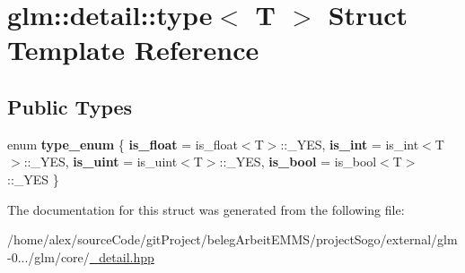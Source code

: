 \hypertarget{structglm_1_1detail_1_1type}{\section{glm\-:\-:detail\-:\-:type$<$ T $>$ Struct Template Reference}
\label{structglm_1_1detail_1_1type}
}
\subsection*{Public Types}
\begin{DoxyCompactItemize}
\item 
enum {\bfseries type\-\_\-enum} \{ {\bfseries is\-\_\-float} = is\-\_\-float$<$T$>$\-:\-:\-\_\-\-Y\-E\-S, 
{\bfseries is\-\_\-int} = is\-\_\-int$<$T$>$\-:\-:\-\_\-\-Y\-E\-S, 
{\bfseries is\-\_\-uint} = is\-\_\-uint$<$T$>$\-:\-:\-\_\-\-Y\-E\-S, 
{\bfseries is\-\_\-bool} = is\-\_\-bool$<$T$>$\-:\-:\-\_\-\-Y\-E\-S
 \}
\end{DoxyCompactItemize}


The documentation for this struct was generated from the following file\-:\begin{DoxyCompactItemize}
\item 
/home/alex/source\-Code/git\-Project/beleg\-Arbeit\-E\-M\-M\-S/project\-Sogo/external/glm-\/0.../glm/core/\hyperlink{__detail_8hpp}{\-\_\-detail.\-hpp}\end{DoxyCompactItemize}
